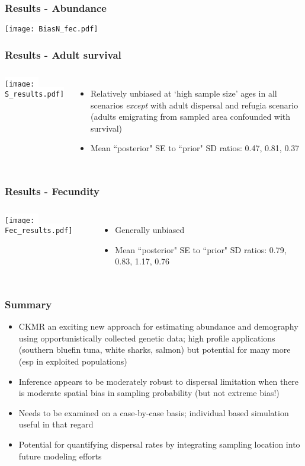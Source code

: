 \documentclass[serif,mathserif]{beamer}
\begin{document}
\begin{frame}
\frametitle{Results - Abundance}
  \colorbox{white}{\texttt{[image: BiasN\_fec.pdf]}}
\end{frame}

\begin{frame}
\frametitle{Results - Adult survival}
  \begin{columns}[c]
  \column{2.5in}
  \colorbox{white}{\texttt{[image: S\_results.pdf]}}
  \column{1.5in}
   \begin{itemize}
   \item Relatively unbiased at `high sample size' ages in all scenarios \textit{except} with adult dispersal and refugia scenario (adults emigrating from sampled area confounded with survival)
   \item Mean ``posterior" SE to ``prior" SD ratios: 0.47, 0.81, 0.37 
   \end{itemize}
  \end{columns}
\end{frame}

\begin{frame}
\frametitle{Results - Fecundity}
  \begin{columns}[c]
  \column{2.5in}
  \colorbox{white}{\texttt{[image: Fec\_results.pdf]}}
       \column{1.5in}
    \begin{itemize}
   \item Generally unbiased
   \item Mean ``posterior" SE to ``prior" SD ratios: 0.79, 0.83, 1.17, 0.76 
   \end{itemize}
   \end{columns}
\end{frame}

\begin{frame}
\frametitle{Summary}
 \begin{itemize}
   \item CKMR an exciting new approach for estimating abundance and demography using opportunistically collected genetic data; high profile applications (southern bluefin tuna, white sharks, salmon) but potential for many more (esp in exploited populations) \pause
   \item Inference appears to be moderately robust to dispersal limitation when there is moderate spatial bias in sampling probability (but not extreme bias!)  \pause
    \item Needs to be examined on a case-by-case basis; individual based simulation useful in that regard \pause
   \item Potential for quantifying dispersal rates by integrating sampling location into future modeling efforts
  \end{itemize}
\end{frame}
\end{document}
